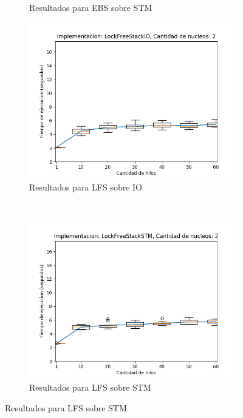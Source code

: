 \begin{figure}[t]
\begin{subfigure}[b]{0.49\textwidth}
        \caption{Resultados para EBS sobre STM}
        \label{subfig:numberOfThreadsDist-ebsstm-2}
    \end{subfigure}
    \begin{subfigure}[b]{0.49\textwidth}
        \includegraphics[width=\textwidth]{images/numberOfThreadsDist/plots/expLFSIO-2}
        \caption{Resultados para LFS sobre IO}
        \label{subfig:numberOfThreadsDist-lfsio-2}
    \end{subfigure}
    ~
    \begin{subfigure}[b]{0.49\textwidth}
        \includegraphics[width=\textwidth]{images/numberOfThreadsDist/plots/expLFSSTM-2}
        \caption{Resultados para LFS sobre STM}
        \label{subfig:numberOfThreadsDist-lfsstm-2}

\end{subfigure}
\end{figure}
